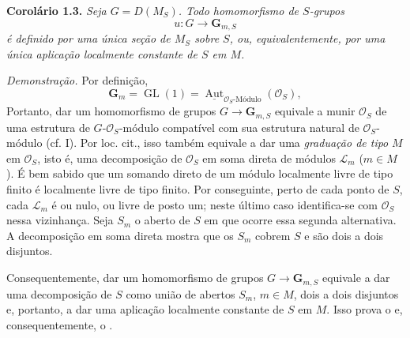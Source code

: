 \medskip
\noindent{}\textbf{Corolário 1.3.}
\textit{Seja \(G=D(M_S)\). Todo homomorfismo de \(S\)-grupos}
\[
  u:G\longrightarrow\mathbf G_{m,S}
\]
\textit{é definido por uma única seção de \(M_S\) sobre \(S\), ou,
equivalentemente, por uma única aplicação localmente constante de \(S\) em
\(M\).}

\emph{Demonstração.}
Por definição,
\[
  \mathbf G_m
  =\operatorname{GL}(1)
  =\underline{\operatorname{Aut}}_{\mathscr O_S\text{-}\text{Módulo}}(\mathscr O_S),
\]
Portanto, dar um homomorfismo de grupos \(G\to\mathbf G_{m,S}\)
equivale a munir \(\mathscr O_S\) de uma estrutura de
\(G\)-\(\mathscr O_S\)-módulo compatível com sua estrutura natural de
\(\mathscr O_S\)-módulo (cf. I). Por loc. cit., isso também equivale a dar
uma \emph{graduação de tipo} \(M\) em \(\mathscr O_S\), isto é, uma decomposição de \(\mathscr O_S\) em soma direta de módulos
\(\mathscr L_m\) (\(m\in M\)).
É bem sabido que um somando direto de um módulo localmente livre de tipo
finito é localmente livre de tipo finito. Por conseguinte, perto de cada
ponto de \(S\), cada \(\mathscr L_m\) é ou nulo, ou livre de posto
um; neste último caso identifica-se com \(\mathscr O_S\) nessa
vizinhança. Seja \(S_m\) o aberto de \(S\) em que ocorre essa segunda
alternativa. A decomposição em soma direta mostra que os \(S_m\)
cobrem \(S\) e são dois a dois disjuntos.

Consequentemente, dar um homomorfismo de grupos
\(G\to\mathbf G_{m,S}\) equivale a dar uma decomposição de \(S\) como
união de abertos \(S_m\), \(m\in M\), dois a dois disjuntos e, portanto,
a dar uma aplicação localmente constante de \(S\) em \(M\). Isso prova
o  e, consequentemente,
o .
